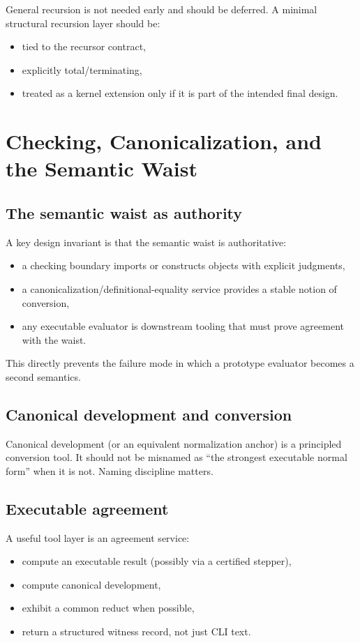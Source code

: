 \documentclass[11pt]{article}
\begin{document}
General recursion is not needed early and should be deferred. A minimal structural recursion layer should be:
\begin{itemize}
  \item tied to the recursor contract,
  \item explicitly total/terminating,
  \item treated as a kernel extension only if it is part of the intended final design.
\end{itemize}

\section{Checking, Canonicalization, and the Semantic Waist}
\subsection{The semantic waist as authority}
A key design invariant is that the semantic waist is authoritative:
\begin{itemize}
  \item a checking boundary imports or constructs objects with explicit judgments,
  \item a canonicalization/definitional-equality service provides a stable notion of conversion,
  \item any executable evaluator is downstream tooling that must prove agreement with the waist.
\end{itemize}

This directly prevents the failure mode in which a prototype evaluator becomes a second semantics.

\subsection{Canonical development and conversion}
Canonical development (or an equivalent normalization anchor) is a principled conversion tool. It should not be misnamed as ``the strongest executable normal form'' when it is not. Naming discipline matters.

\subsection{Executable agreement}
A useful tool layer is an agreement service:
\begin{itemize}
  \item compute an executable result (possibly via a certified stepper),
  \item compute canonical development,
  \item exhibit a common reduct when possible,
  \item return a structured witness record, not just CLI text.
\end{itemize}
\end{document}
